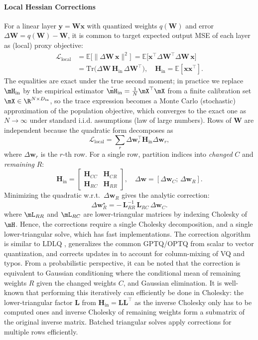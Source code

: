 \documentclass{article}
\theoremstyle{plain}
\theoremstyle{definition}
\theoremstyle{remark}
\begin{document}
\paragraph{Local Hessian Corrections}
For a linear layer $\mathbf{y} = \mathbf{W}\mathbf{x}$ with quantized weights $q(\mathbf{W})$ and error $\Delta\mathbf{W} = q(\mathbf{W}) - \mathbf{W}$, it is common \citep{nagel2020up} to target expected output MSE of each layer as (local) proxy objective:
\begin{align}
\mathcal{L}_{\text{local}}
&= \mathbb{E}\big[\| \Delta\mathbf{W}\,\mathbf{x}\|^2\big]\ 
= \mathbb{E}\big[\mathbf{x}^\top \Delta\mathbf{W}^\top \Delta\mathbf{W}\,\mathbf{x}\big] \\
&= \mathrm{Tr}\!\big(\Delta\mathbf{W}\,\mathbf{H}_{\text{in}}\,\Delta\mathbf{W}^\top\big),
\quad \mathbf{H}_{\text{in}} = \mathbb{E}[\mathbf{x}\mathbf{x}^\top].
\end{align}
The equalities are exact under the true second moment; in practice we replace $\mH_{\text{in}}$ by the empirical estimator $\tilde{\mH}_{\text{in}} = \frac{1}{N} \mX^{\top}\mX$ from a finite calibration set $\mX \in \R^{N \times D_{\text{in}}}$, so the trace expression becomes a Monte Carlo (stochastic) approximation of the population objective, which converges to the exact one as $N \to \infty$ under standard i.i.d. assumptions (law of large numbers).
Rows of $\mathbf{W}$ are independent because the quadratic form decomposes as
\[
\mathcal{L}_{\text{local}} = \sum_{r} \Delta\mathbf{w}_r^\top \mathbf{H}_{\text{in}} \Delta\mathbf{w}_r,
\]
where $\Delta\mathbf{w}_r$ is the $r$-th row. For a single row, partition indices into \emph{changed} $C$ and \emph{remaining} $R$:
\[
\mathbf{H}_{\text{in}} =
\begin{bmatrix}
\mathbf{H}_{CC} & \mathbf{H}_{CR}\\
\mathbf{H}_{RC} & \mathbf{H}_{RR}
\end{bmatrix}, \quad
\Delta\mathbf{w} = [\Delta\mathbf{w}_C;\,\Delta\mathbf{w}_R].
\]
Minimizing the quadratic w.r.t.\ $\Delta\mathbf{w}_R$ gives the analytic correction:
\[
\boxed{\Delta\mathbf{w}_R^\star = -\,\mathbf{L}_{RR}^{-1}\,\mathbf{L}_{RC}\,\Delta\mathbf{w}_C.}
\]
where $\mL_{RR}$ and $\mL_{RC}$ are lower-triangular matrices by indexing Cholesky of $\mH$. Hence, the corrections require a single Cholesky decomposition, and a single lower-triangular solve, which has fast implementations. The correction algorithm is similar to LDLQ \citep{tseng2024quip}, generalizes the common GPTQ/OPTQ  \citep{frantar2022gptq} from scalar to vector quantization, and corrects updates in \citep{van2024gptvq} to account for column-mixing of VQ and typos. From a probabilistic perspective, it can be noted that the correction is equivalent to Gaussian conditioning where the conditional mean of remaining weights $R$ given the changed weights $C$, and Gaussian elimination. It is well-known that performing this iteratively can efficiently be done in Cholesky: the lower-triangular factor $\mathbf{L}$ from $\mathbf{H}_{\text{in}} = \mathbf{L}\mathbf{L}^\top$ as the inverse Cholesky only has to be computed ones and inverse Cholesky of remaining weights form a submatrix of the original inverse matrix. Batched triangular solves apply corrections for multiple rows efficiently.
\end{document}
